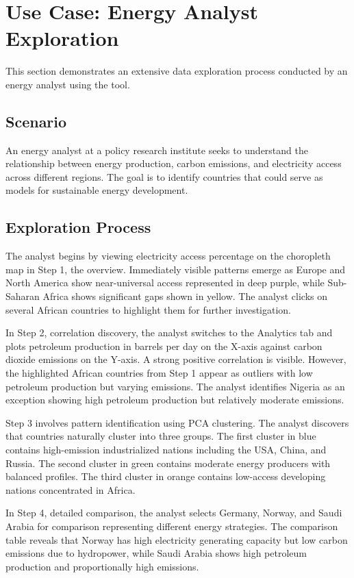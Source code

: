 \documentclass[conference]{IEEEtran}
\begin{document}
\section{Use Case: Energy Analyst Exploration}
This section demonstrates an extensive data exploration process conducted by an energy analyst using the tool.

\subsection{Scenario}
An energy analyst at a policy research institute seeks to understand the relationship between energy production, carbon emissions, and electricity access across different regions. The goal is to identify countries that could serve as models for sustainable energy development.

\subsection{Exploration Process}
The analyst begins by viewing electricity access percentage on the choropleth map in Step 1, the overview. Immediately visible patterns emerge as Europe and North America show near-universal access represented in deep purple, while Sub-Saharan Africa shows significant gaps shown in yellow. The analyst clicks on several African countries to highlight them for further investigation.

In Step 2, correlation discovery, the analyst switches to the Analytics tab and plots petroleum production in barrels per day on the X-axis against carbon dioxide emissions on the Y-axis. A strong positive correlation is visible. However, the highlighted African countries from Step 1 appear as outliers with low petroleum production but varying emissions. The analyst identifies Nigeria as an exception showing high petroleum production but relatively moderate emissions.

Step 3 involves pattern identification using PCA clustering. The analyst discovers that countries naturally cluster into three groups. The first cluster in blue contains high-emission industrialized nations including the USA, China, and Russia. The second cluster in green contains moderate energy producers with balanced profiles. The third cluster in orange contains low-access developing nations concentrated in Africa.

In Step 4, detailed comparison, the analyst selects Germany, Norway, and Saudi Arabia for comparison representing different energy strategies. The comparison table reveals that Norway has high electricity generating capacity but low carbon emissions due to hydropower, while Saudi Arabia shows high petroleum production and proportionally high emissions.
\end{document}
